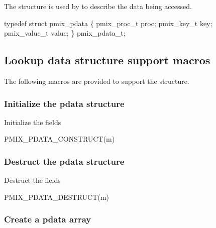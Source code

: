 The  structure is used by  to describe the data being accessed.

\cspecificstart
\begin{codepar}
typedef struct pmix_pdata \{
    pmix_proc_t proc;
    pmix_key_t key;
    pmix_value_t value;
\} pmix_pdata_t;
\end{codepar}
\cspecificend

\subsection{Lookup data structure support macros}

The following macros are provided to support the  structure.

\subsubsection{Initialize the pdata structure}

Initialize the  fields

\cspecificstart
\begin{codepar}
PMIX_PDATA_CONSTRUCT(m)
\end{codepar}
\cspecificend

\begin{arglist}
\end{arglist}

\subsubsection{Destruct the pdata structure}

Destruct the  fields

\cspecificstart
\begin{codepar}
PMIX_PDATA_DESTRUCT(m)
\end{codepar}
\cspecificend

\begin{arglist}
\end{arglist}

\subsubsection{Create a pdata array}

